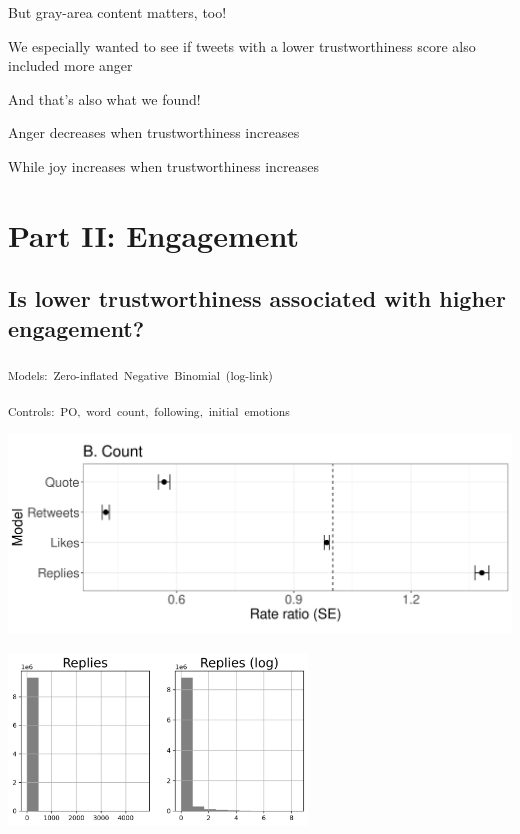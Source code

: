\documentclass[
  letterpaper,
  DIV=11,
  numbers=noendperiod]{scrartcl}
\begin{document}
But gray-area content matters, too!

We especially wanted to see if tweets with a lower trustworthiness score
also included more anger

And that's also what we found!

Anger decreases when trustworthiness increases

While joy increases when trustworthiness increases

\hypertarget{part-ii-engagement}{%
\section{Part II: Engagement}\label{part-ii-engagement}}

\hypertarget{is-lower-trustworthiness-associated-with-higher-engagement}{%
\subsection{Is lower trustworthiness associated with higher
engagement?}\label{is-lower-trustworthiness-associated-with-higher-engagement}}

\textsubscript{Models:~Zero-inflated~Negative~Binomial~(log-link)}

\textsubscript{Controls:~PO,~word~count,~following,~initial~emotions}

\includegraphics[width=6.25in,height=\textheight]{images/models_zinb_estimates-se.png}

\includegraphics[width=3.125in,height=\textheight]{images/reply_distributions.png}
\end{document}
